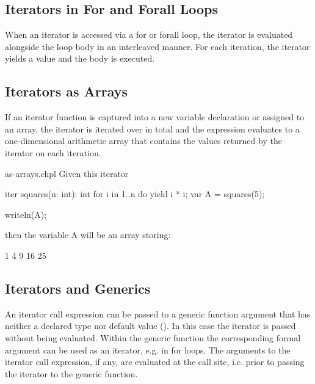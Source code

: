 \subsection{Iterators in For and Forall Loops}
\label{Iterators_in_For_and_Forall_Loops}

When an iterator is accessed via a for or forall loop, the iterator is
evaluated alongside the loop body in an interleaved manner.  For each
iteration, the iterator yields a value and the body is executed.

\subsection{Iterators as Arrays}
\label{Iterators_as_Arrays}

If an iterator function is captured into a new variable declaration or
assigned to an array, the iterator is iterated over in total and the
expression evaluates to a one-dimensional arithmetic array that
contains the values returned by the iterator on each iteration.
\begin{chapelexample}{as-arrays.chpl}
Given this iterator
\begin{chapel}
iter squares(n: int): int {
  for i in 1..n do
    yield i * i;
}
var A = squares(5);
\end{chapel}
\begin{chapelpost}
writeln(A);
\end{chapelpost}
then the variable A will be an array storing:
\begin{chapelprintoutput}{}
1 4 9 16 25
\end{chapelprintoutput}
\end{chapelexample}

\subsection{Iterators and Generics}
\label{Iterators_and_Generics}

An iterator call expression can be passed to a generic function argument that
has neither a declared type nor default value
().
In this case the iterator is passed without being evaluated.
Within the generic function the corresponding formal argument
can be used as an iterator, e.g. in for loops.
The arguments to the iterator call expression, if any, are evaluated
at the call site, i.e. prior to passing the iterator to the generic function.

